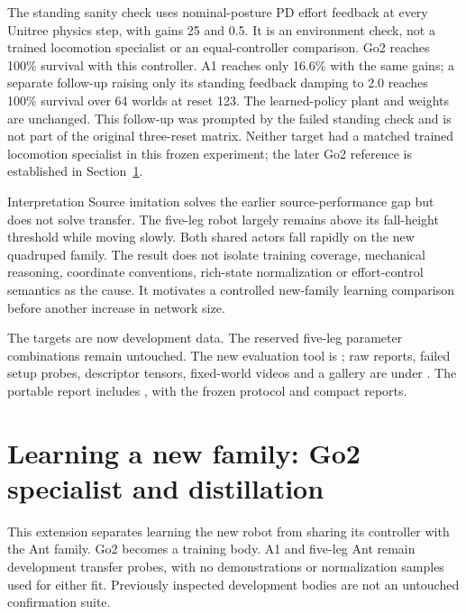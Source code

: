 \documentclass[11pt,letterpaper]{article}
\begin{document}
The standing sanity check uses nominal-posture PD effort feedback at every
Unitree physics step, with gains 25 and 0.5. It is an environment check, not a
trained locomotion specialist or an equal-controller comparison. Go2 reaches
100\% survival with this controller. A1 reaches only 16.6\% with the same gains;
a separate follow-up raising only its standing feedback damping to 2.0 reaches
100\% survival over 64 worlds at reset 123. The learned-policy plant and weights
are unchanged. This follow-up was prompted by the failed standing check and is
not part of the original three-reset matrix. Neither target had a matched
trained locomotion specialist in this frozen experiment; the later Go2
reference is established in Section~\ref{sec:go2learning}.

\begin{finding}{Interpretation}
Source imitation solves the earlier source-performance gap but does not solve
transfer. The five-leg robot largely remains above its fall-height threshold
while moving slowly. Both shared actors fall rapidly on the new quadruped
family. The result does not isolate training coverage, mechanical reasoning,
coordinate conventions, rich-state normalization or effort-control semantics
as the cause. It motivates a controlled new-family learning comparison before
another increase in network size.
\end{finding}

The targets are now development data. The reserved five-leg parameter
combinations remain untouched. The new evaluation tool is
; raw reports, failed setup
probes, descriptor tensors, fixed-world videos and a gallery are under
. The portable report includes
, with the frozen protocol and compact reports.

\section{Learning a new family: Go2 specialist and distillation}
\label{sec:go2learning}

This extension separates learning the new robot from sharing its controller with
the Ant family. Go2 becomes a training body. A1 and five-leg Ant remain
development transfer probes, with no demonstrations or normalization samples used
for either fit. Previously inspected development bodies are not an untouched
confirmation suite.
\end{document}
